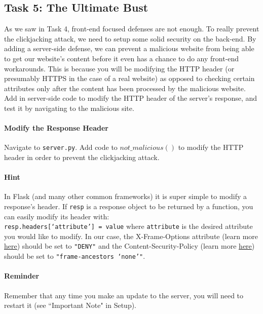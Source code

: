 
\subsection{Task 5: The Ultimate Bust}
As we saw in Task 4, front-end focused defenses are not enough. To really prevent the clickjacking attack, we need to setup some solid security on the back-end. By adding a server-side defense, we can prevent a malicious website from being able to get our website's content before it even has a chance to do any front-end workarounds. This is because you will be modifying the HTTP header (or presumably HTTPS in the case of a real website) as opposed to checking certain attributes only after the content has been processed by the malicious website. Add in server-side code to modify the HTTP header of the server's response, and test it by navigating to the malicious site.

\paragraph{Modify the Response Header} Navigate to \texttt{server.py}. Add code to $not\_malicious()$ to modify the HTTP header in order to prevent the clickjacking attack.

\paragraph{Hint} In Flask (and many other common frameworks) it is super simple to modify a response's header. If \texttt{resp} is a response object to be returned by a function, you can easily modify its header with:
\\\texttt{resp.headers[`attribute'] = value} where \texttt{attribute} 
is the desired attribute you would like to modify. In our case, the X-Frame-Options attribute (learn more \underline{\href{https://developer.mozilla.org/en-US/docs/Web/HTTP/Headers/X-Frame-Options}{here}}) should be set to \texttt{"DENY"} and the Content-Security-Policy (learn more \underline{\href{https://developer.mozilla.org/en-US/docs/Web/HTTP/CSP}{here}}) should be set to \texttt{"frame-ancestors `none'"}.


\paragraph{Reminder} Remember that any time you make an update to the server, you will need to restart it (see ``Important Note" in Setup).



